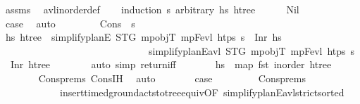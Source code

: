 \begin{isabellebody}
\endisadelimproof
%
\isatagproof
{}\isamarkupfalse%
\ assms\ \isamarkupfalse%
\ avl{\isacharunderscore}{\kern0pt}inorder{\isacharunderscore}{\kern0pt}def\isanewline
\ \ \isamarkupfalse%
\ {\isacharparenleft}{\kern0pt}induction\ {\isasympi}s\ arbitrary{\isacharcolon}{\kern0pt}\ hs\ htree{\isacharparenright}{\kern0pt}\isanewline
\ \ \ \ \isamarkupfalse%
\ Nil\isanewline
\ \ \ \ \isamarkupfalse%
\ \isamarkupfalse%
\ {\isacharquery}{\kern0pt}case\ \isamarkupfalse%
\ auto\isanewline
\ \ \isamarkupfalse%
\isanewline
\ \ \ \ \isamarkupfalse%
\ {\isacharparenleft}{\kern0pt}Cons\ {\isasympi}\ {\isasympi}s{\isacharparenright}{\kern0pt}\isanewline
\ \ \ \ \isamarkupfalse%
\ \isamarkupfalse%
\ hs{\isacharprime}{\kern0pt}\ htree{\isacharprime}{\kern0pt}\ \ {\isachardoublequoteopen}simplify{\isacharunderscore}{\kern0pt}planE\ STG\ mp{\isacharunderscore}{\kern0pt}objT\ mp{\isacharunderscore}{\kern0pt}Fevl\ htps\ {\isasympi}s\ {\isacharequal}{\kern0pt}\ Inr\ hs{\isacharprime}{\kern0pt}{\isachardoublequoteclose}\isanewline
\ \ \ \ \ \ \ \ \ \ \ \ \ \ \ \ \ \ \ \ \ \ \ \ \ \ \ \ \ \ {\isachardoublequoteopen}simplify{\isacharunderscore}{\kern0pt}planE{\isacharunderscore}{\kern0pt}avl{\isacharprime}{\kern0pt}\ STG\ mp{\isacharunderscore}{\kern0pt}objT\ mp{\isacharunderscore}{\kern0pt}Fevl\ htps\ {\isasympi}s\ {\isacharequal}{\kern0pt}\ Inr\ htree{\isacharprime}{\kern0pt}{\isachardoublequoteclose}\isanewline
\ \ \ \ \ \ \isamarkupfalse%
\ {\isacharparenleft}{\kern0pt}auto\ simp{\isacharcolon}{\kern0pt}\ return{\isacharunderscore}{\kern0pt}iff{\isacharparenright}{\kern0pt}\isanewline
\ \ \ \ \isamarkupfalse%
\ \isamarkupfalse%
\ {\isachardoublequoteopen}hs{\isacharprime}{\kern0pt}\ {\isacharequal}{\kern0pt}\ map\ fst\ {\isacharparenleft}{\kern0pt}inorder\ htree{\isacharprime}{\kern0pt}{\isacharparenright}{\kern0pt}{\isachardoublequoteclose}\isanewline
\ \ \ \ \ \ \isamarkupfalse%
\ Cons{\isachardot}{\kern0pt}prems\ Cons{\isachardot}{\kern0pt}IH\ \isamarkupfalse%
\ auto\isanewline
\ \ \ \ \isamarkupfalse%
\ \isamarkupfalse%
\ {\isacharquery}{\kern0pt}case\ \isanewline
\ \ \ \ \ \ \isamarkupfalse%
\ Cons{\isachardot}{\kern0pt}prems\ \isanewline
\ \ \ \ \ \ \ \ \ \ \ \ insert{\isacharunderscore}{\kern0pt}timed{\isacharunderscore}{\kern0pt}ground{\isacharunderscore}{\kern0pt}acts{\isacharunderscore}{\kern0pt}to{\isacharunderscore}{\kern0pt}tree{\isacharunderscore}{\kern0pt}equiv{\isacharbrackleft}{\kern0pt}OF\ simplify{\isacharunderscore}{\kern0pt}planE{\isacharunderscore}{\kern0pt}avl{\isacharprime}{\kern0pt}{\isacharunderscore}{\kern0pt}strict{\isacharunderscore}{\kern0pt}sorted{\isacharbrackright}{\kern0pt}\isanewline

\end{isabellebody}
